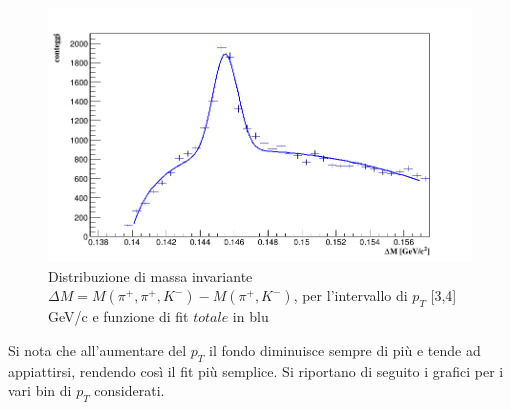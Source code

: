     \begin{figure}[htbp] 
        \centering
        \includegraphics[width=0.9\linewidth]{AnalisiDati/pt_3_4_pol2.png}
        \caption{Distribuzione di massa invariante $\Delta M = M(\pi^+,\pi^+,K^-) - M(\pi^+,K^-)$, per l'intervallo di $p_T$ [3,4] GeV/c e funzione di fit $totale$ in blu}
        \label{fig:fit_3_4}
    \end{figure}
    
Si nota che all'aumentare del $p_T$ il fondo diminuisce sempre di più e tende ad appiattirsi, rendendo così il fit più semplice.
Si riportano di seguito i grafici per i vari bin di $p_T$ considerati. 
\\

